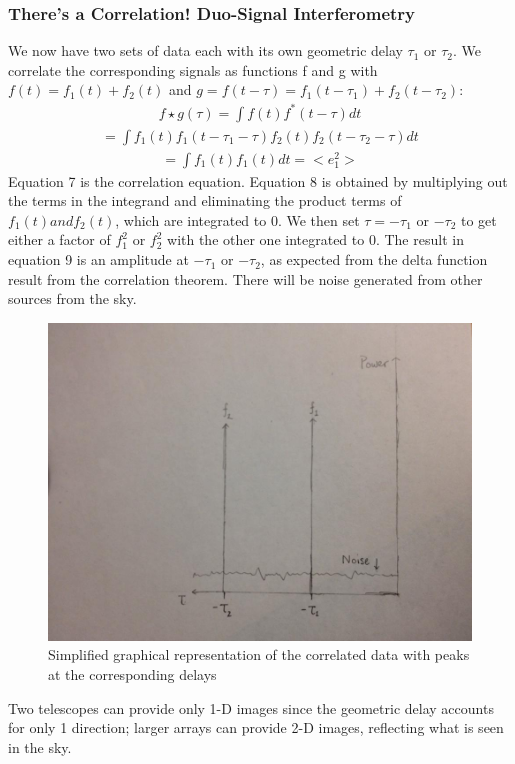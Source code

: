 \documentclass{article}
\begin{document}
\subsubsection{There's a Correlation! Duo-Signal Interferometry}
We now have two sets of data each with its own geometric delay
$\tau_{1}$ or $\tau_{2}$. We correlate the corresponding signals as
functions f and g with $f(t) = f_{1}(t) + f_{2}(t)$ and $g = f(t-\tau) =
f_{1}(t-\tau_{1}) + f_{2}(t-\tau_{2})$:
\begin{align}f\star{g}(\tau) = \int{f(t)f^{\ast}(t-\tau)dt} 
\end{align}
\begin{align}=
  \int{f_{1}(t)f_{1}(t-\tau_{1}-\tau)f_{2}(t)f_{2}(t-\tau_{2}-\tau)dt}
\end{align}
\begin{align}= \int{f_{1}(t)f_{1}(t)dt} = <e_{1}^{2}>
\end{align}
Equation 7 is the correlation equation. Equation 8 is obtained by
multiplying out the terms in the integrand and eliminating the product 
terms of $f_{1}(t) and f_{2}(t)$, which are integrated to 0. We then set 
$\tau = -\tau_{1}$ or $-\tau_{2}$ to get either a factor of $f_{1}^{2}$
or $f_{2}^{2}$ with the other one integrated to 0. The result in
equation 9 is an amplitude at $-\tau_{1}$ or $-\tau_{2}$, as expected
from the delta function result from the correlation theorem. There will 
be noise generated from other sources from the sky.
\begin{figure}[!h]
\centering
\includegraphics[width=.55\textwidth]{power_period.png}
\caption{Simplified graphical representation of the correlated data with peaks at
  the corresponding delays}
\end{figure}
Two telescopes can provide only 1-D images since the geometric delay
accounts for only 1 direction; larger arrays can provide 2-D images,
reflecting what is seen in the sky.
\end{document}
